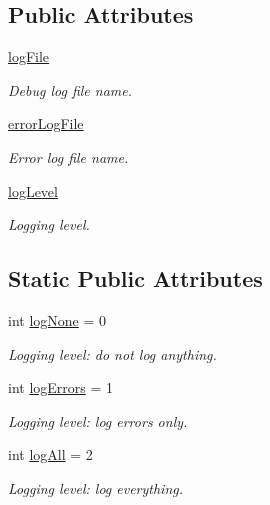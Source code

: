 \subsection*{Public Attributes}
\begin{DoxyCompactItemize}
\item 
\hyperlink{classproto2cpp_1_1proto2cpp_a06614bc26f0849809d3bf6b5092f8f9c}{log\+File}
\begin{DoxyCompactList}\small\item\em Debug log file name. \end{DoxyCompactList}\item 
\hyperlink{classproto2cpp_1_1proto2cpp_a6bcbded937d299e48e0fb03a1dce9709}{error\+Log\+File}
\begin{DoxyCompactList}\small\item\em Error log file name. \end{DoxyCompactList}\item 
\hyperlink{classproto2cpp_1_1proto2cpp_a56767af005e7589efa89611e979ebd34}{log\+Level}
\begin{DoxyCompactList}\small\item\em Logging level. \end{DoxyCompactList}\end{DoxyCompactItemize}
\subsection*{Static Public Attributes}
\begin{DoxyCompactItemize}
\item 
int \hyperlink{classproto2cpp_1_1proto2cpp_a85f1be79a05376f69b9a75c28ebdd29c}{log\+None} = 0
\begin{DoxyCompactList}\small\item\em Logging level\+: do not log anything. \end{DoxyCompactList}\item 
int \hyperlink{classproto2cpp_1_1proto2cpp_ad88c9b4f3034ecbebc9980aa0d0de616}{log\+Errors} = 1
\begin{DoxyCompactList}\small\item\em Logging level\+: log errors only. \end{DoxyCompactList}\item 
int \hyperlink{classproto2cpp_1_1proto2cpp_a0608421165933b9b58e98ac02bbc6141}{log\+All} = 2
\begin{DoxyCompactList}\small\item\em Logging level\+: log everything. \end{DoxyCompactList}\end{DoxyCompactItemize}


